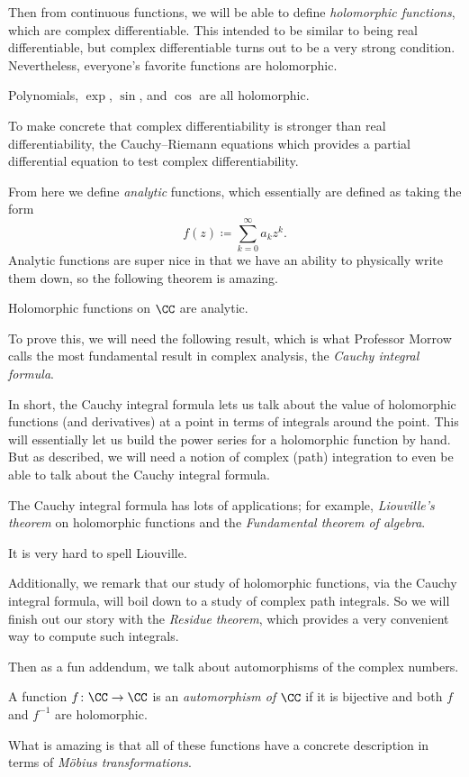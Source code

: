 Then from continuous functions, we will be able to define \textit{holomorphic functions}, which are complex differentiable. This intended to be similar to being real differentiable, but complex differentiable turns out to be a very strong condition. Nevertheless, everyone's favorite functions are holomorphic.
\begin{example}
	Polynomials, $\exp$, $\sin$, and $\cos$ are all holomorphic.
\end{example}
To make concrete that complex differentiability is stronger than real differentiability, the Cauchy--Riemann equations which provides a partial differential equation to test complex differentiability.

From here we define \textit{analytic} functions, which essentially are defined as taking the form
\[f(z)\coloneqq \sum_{k=0}^\infty a_kz^k.\]
Analytic functions are super nice in that we have an ability to physically write them down, so the following theorem is amazing.
\begin{theorem}
	Holomorphic functions on $\CC$ are analytic.
\end{theorem}
To prove this, we will need the following result, which is what Professor Morrow calls the most fundamental result in complex analysis, the \textit{Cauchy integral formula}.

In short, the Cauchy integral formula lets us talk about the value of holomorphic functions (and derivatives) at a point in terms of integrals around the point. This will essentially let us build the power series for a holomorphic function by hand. But as described, we will need a notion of complex (path) integration to even be able to talk about the Cauchy integral formula.

The Cauchy integral formula has lots of applications; for example, \textit{Liouville's theorem} on holomorphic functions and the \textit{Fundamental theorem of algebra}.
\begin{remark}
	It is very hard to spell Liouville.
\end{remark}
Additionally, we remark that our study of holomorphic functions, via the Cauchy integral formula, will boil down to a study of complex path integrals. So we will finish out our story with the \textit{Residue theorem}, which provides a very convenient way to compute such integrals.

Then as a fun addendum, we talk about automorphisms of the complex numbers.
\begin{definition}
	A function $f\colon\CC\to\CC$ is an \textit{automorphism of $\CC$} if it is bijective and both $f$ and $f^{-1}$ are holomorphic.
\end{definition}
\noindent What is amazing is that all of these functions have a concrete description in terms of \textit{M\"obius transformations}.

